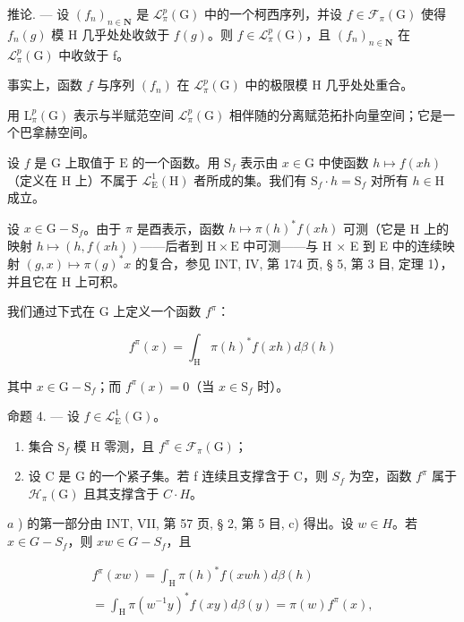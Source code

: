 推论. --- 设 \((f_{n})_{n\in\mathbf{N}}\) 是 \(\mathcal{L}_{\pi}^{p}(\mathrm{G})\) 中的一个柯西序列，并设 \(f\in\mathcal{F}_{\pi}(\mathrm{G})\) 使得 \(f_{n}(g)\) 模 H 几乎处处收敛于 \(f(g)\)。则 \(f\in\mathcal{L}_{\pi}^{p}(\mathrm{G})\)，且 \((f_{n})_{n\in\mathbf{N}}\) 在 \(\mathcal{L}_{\pi}^{p}(\mathrm{G})\) 中收敛于 f。

事实上，函数 \(f\) 与序列 \((f_n)\) 在 \(\mathcal{L}_{\pi}^{p}(\mathrm{G})\) 中的极限模 H 几乎处处重合。

用 \(\mathrm{L}_{\pi}^{p}(\mathrm{G})\) 表示与半赋范空间 \(\mathcal{L}_{\pi}^{p}(\mathrm{G})\) 相伴随的分离赋范拓扑向量空间；它是一个巴拿赫空间。

设 \(f\) 是 \(\mathrm{G}\) 上取值于 \(\mathrm{E}\) 的一个函数。用 \(\mathrm{S}_{f}\) 表示由 \(x\in \mathrm{G}\) 中使函数 \(h\mapsto f(xh)\)（定义在 \(\mathrm{H}\) 上）不属于 \(\mathcal{L}_{\mathrm{E}}^{1}(\mathrm{H})\) 者所成的集。我们有 \(\mathrm{S}_f\cdot h = \mathrm{S}_f\) 对所有 \(h\in \mathrm{H}\) 成立。

设 \(x \in \mathrm{G} - \mathrm{S}_f\)。由于 \(\pi\) 是酉表示，函数 \(h \mapsto \pi(h)^* f(xh)\) 可测（它是 H 上的映射 \(h \mapsto (h, f(xh))\)——后者到 \(\mathrm{H} \times \mathrm{E}\) 中可测——与 H × E 到 E 中的连续映射 \((g,x)\mapsto\pi(g)^{*}x\) 的复合，参见 INT, IV, 第 174 页, § 5, 第 3 目, 定理 1），并且它在 H 上可积。

我们通过下式在 G 上定义一个函数 \(f^{\pi}\)：

\[
f ^ {\pi} (x) = \int_ {\mathrm{H}} \pi (h) ^ {*} f (x h) d \beta (h)\tag{3}
\]

其中 \(x \in \mathrm{G} - \mathrm{S}_f\)；而 \(f^\pi(x) = 0\)（当 \(x \in \mathrm{S}_f\) 时）。

命题 4. --- 设 \(f \in \mathcal{L}_{\mathrm{E}}^{1}(\mathrm{G})\)。

\begin{enumerate}
\def\labelenumi{\alph{enumi})}
\item
  集合 \(\mathrm{S}_f\) 模 H 零测，且 \(f^\pi \in \mathcal{F}_\pi(\mathrm{G})\)；
\item
  设 C 是 G 的一个紧子集。若 f 连续且支撑含于 C，则 \(S_{f}\) 为空，函数 \(f^{\pi}\) 属于 \(\mathcal{H}_{\pi}(\mathrm{G})\) 且其支撑含于 \(C \cdot H\)。
\end{enumerate}

\(a\) ) 的第一部分由 INT, VII, 第 57 页, § 2, 第 5 目, c) 得出。设 \(w \in H\)。若 \(x \in G - S_f\)，则 \(xw \in G - S_f\)，且

\[
\begin{array}{c} f ^ {\pi} (x w) = \int_ {\mathrm{H}} \pi (h) ^ {*} f (x w h) d \beta (h) \\ = \int_ {\mathrm{H}} \pi (w ^ {- 1} y) ^ {*} f (x y) d \beta (y) = \pi (w) f ^ {\pi} (x), \end{array}
\]

